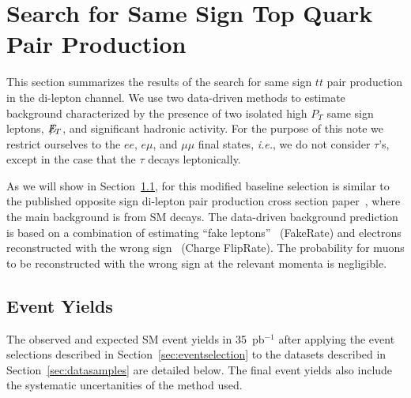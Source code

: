 \section{Search for Same Sign Top Quark Pair Production}
\label{sec:samesign}

This section summarizes the results of the search for same sign $tt$
pair production in the di-lepton channel. We use two data-driven methods 
to estimate background characterized by the presence of two isolated high $P_T$ same 
sign leptons, $E\!\!\!\!/_T$, and significant hadronic activity. For the purpose of this note we 
restrict ourselves to the $ee$, $e\mu$, and $\mu\mu$ final states, {\em i.e.}, we do not 
consider $\tau$'s, except in the case that the $\tau$ decays leptonically. 

As we will show in Section~\ref{sec:ssyields}, for this modified baseline selection is similar to
the published opposite sign di-lepton pair production cross section paper~\cite{topxsection}, where the main 
background is from SM \ttbar decays. The data-driven background prediction is based on a combination 
of estimating ``fake leptons''~\cite{fakenote} (FakeRate) and electrons reconstructed with the 
wrong sign~\cite{ssnote1} (Charge FlipRate). The probability for muons to be reconstructed with 
the wrong sign at the relevant momenta is negligible.

\subsection{Event Yields}
\label{sec:ssyields}

The observed and expected SM event yields in 35~pb$^{-1}$ after applying the event selections
described in Section~\ref{sec:eventselection} to the datasets described in Section~\ref{sec:datasamples} 
are detailed below. The final event yields also include the systematic uncertanities of
the method used.

